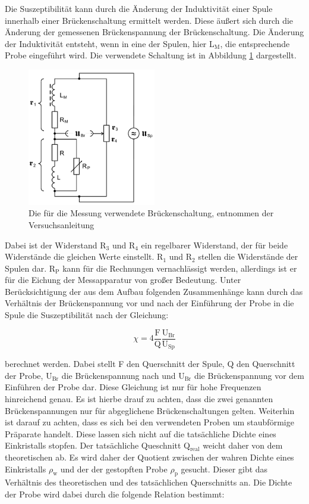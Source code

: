 Die Suszeptibilität kann durch die Änderung der Induktivität einer Spule innerhalb einer Brückenschaltung ermittelt werden.
Diese äußert sich durch die Änderung der gemessenen Brückenspannung der Brückenschaltung.
Die Änderung der Induktivität entsteht, wenn in eine der Spulen, hier L$_\text{M}$, die entsprechende Probe eingeführt wird.
Die verwendete Schaltung ist in Abbildung \ref{fig:Brückenschaltung} dargestellt.

\begin{figure}
  \centering
  \includegraphics[width=0.5\textwidth]{images/Brueckenschaltung.png}
  \caption{Die für die Messung verwendete Brückenschaltung, entnommen der Versuchsanleitung\cite[179]{sample}}
  \label{fig:Brückenschaltung}
\end{figure}

Dabei ist der Widerstand R$_3$ und R$_4$ ein regelbarer Widerstand, der für beide Widerstände die gleichen Werte einstellt.
R$_1$ und R$_2$ stellen die Widerstände der Spulen dar.
R$_\text{P}$ kann für die Rechnungen vernachlässigt werden, allerdings ist er für die Eichung der Messapparatur von großer Bedeutung.
Unter Berücksichtigung der aus dem Aufbau folgenden Zusammenhänge  kann durch das Verhältnis der Brückenspannung vor und nach der Einführung der Probe in die Spule die Suszeptibilität nach der Gleichung:

\begin{equation}
  \chi = 4 \frac{\text{F}}{\text{Q}} \frac{\text{U}_\text{Br}}{\text{U}_\text{Sp}}
  \label{eqn:chi1}
\end{equation}

berechnet werden.
Dabei stellt F den Querschnitt der Spule, Q den Querschnitt der Probe, $\text{U}_\text{Br}$ die Brückenspannung nach und $\text{U}_\text{Br}$ die Brückenspannung vor dem Einführen der Probe dar.
Diese Gleichung ist nur für hohe Frequenzen hinreichend genau.
Es ist hierbe drauf zu achten, dass die zwei genannten Brückenspannungen nur für abgeglichene Brückenschaltungen gelten.
Weiterhin ist darauf zu achten, dass es sich bei den verwendeten Proben um staubförmige Präparate handelt.
Diese lassen sich nicht auf die tatsächliche Dichte eines Einkristalls stopfen.
Der tatsächliche Queschnitt Q$_\text{real}$ weicht daher von dem theoretischen ab.
Es wird daher der Quotient zwischen der wahren Dichte eines Einkristalls $\rho_\text{w}$ und der der gestopften Probe $\rho_\text{p}$ gesucht.
Dieser gibt das Verhältnis des theoretischen und des tatsächlichen Querschnitts an.
Die Dichte der Probe wird dabei durch die folgende Relation bestimmt:

